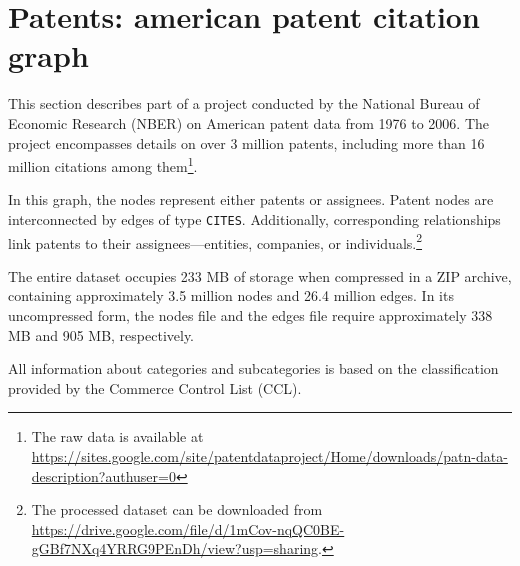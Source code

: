 \section{Patents: american patent citation graph}
This section describes part of a project conducted by the National Bureau of Economic Research (NBER) \cite{patentsource} on American patent data from 1976 to 2006. The project encompasses details on over 3 million patents, including more than 16 million citations among them\footnote{The raw data is available at \url{https://sites.google.com/site/patentdataproject/Home/downloads/patn-data-description?authuser=0}}.

In this graph, the nodes represent either patents or assignees. Patent nodes are interconnected by edges of type \texttt{CITES}. Additionally, corresponding relationships link patents to their assignees—entities, companies, or individuals.\footnote{The processed dataset can be downloaded from \url{https://drive.google.com/file/d/1mCov-nqQC0BE-gGBf7NXq4YRRG9PEnDh/view?usp=sharing}.}

The entire dataset occupies 233 MB of storage when compressed in a ZIP archive, containing approximately 3.5 million nodes and 26.4 million edges. In its uncompressed form, the nodes file and the edges file require approximately 338 MB and 905 MB, respectively.

All information about categories and subcategories is based on the classification provided by the Commerce Control List (CCL).

